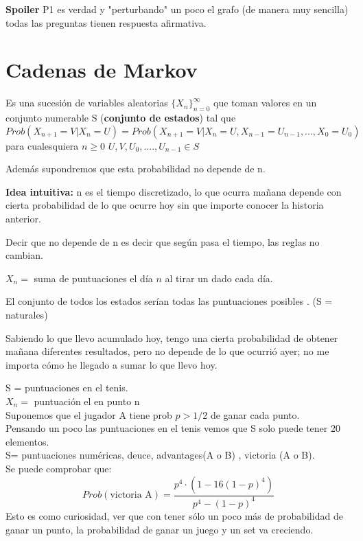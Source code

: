 \textbf{Spoiler} P1 es verdad y "perturbando" un poco el grafo (de manera muy sencilla) todas las preguntas tienen respuesta afirmativa.



\section{Cadenas de Markov}

\begin{defn}
	Es una sucesión de variables aleatorias $\{X_n\}_{n=0}^{\infty}$ que toman valores en un conjunto numerable S (\textbf{conjunto de estados}) tal que
	$$Prob(X_{n+1} = V | X_n = U) = Prob(X_{n+1} = V | X_n =U , X_{n-1} = U_{n-1} , ... , X_0 = U_0)$$
	para cualesquiera $n \geq 0$ $U,V,U_0,.... ,U_{n-1} \in S$
\end{defn}


\obs Además supondremos que esta probabilidad no depende de n.


\textbf{Idea intuitiva: } n es el tiempo discretizado, lo que ocurra mañana depende con cierta probabilidad de lo que ocurre hoy sin que importe conocer la historia anterior.

Decir que no depende de n es decir que según pasa el tiempo, las reglas no cambian.

\begin{example}
	$X_n =$ suma de puntuaciones el día $n$ al tirar un dado cada día.

	El conjunto de todos los estados serían todas las puntuaciones posibles . (S = naturales)

	Sabiendo lo que llevo acumulado hoy, tengo una cierta probabilidad de obtener mañana diferentes resultados, pero no depende de lo que ocurrió ayer; no me importa cómo he llegado a sumar lo que llevo hoy.
\end{example}

\begin{example}[2]
	S = puntuaciones en el tenis.\\
	$X_n =$ puntuación el en punto n\\
	Suponemos que el jugador A tiene prob $p > 1/2$ de ganar cada punto.\\
	Pensando un poco las puntuaciones en el tenis vemos que S solo puede tener 20 elementos.\\
	S= puntuaciones numéricas, deuce, advantages(A o B) , victoria (A o B).\\
	Se puede comprobar que:
	$$Prob(\text{victoria A}) = \frac{p^4 \cdot(1- 16(1-p)^4)}{p^4 - (1-p)^4}$$
	Esto es como curiosidad, ver que con tener sólo un poco más de probabilidad de ganar un punto, la probabilidad de ganar un juego y un set va creciendo.
\end{example}




